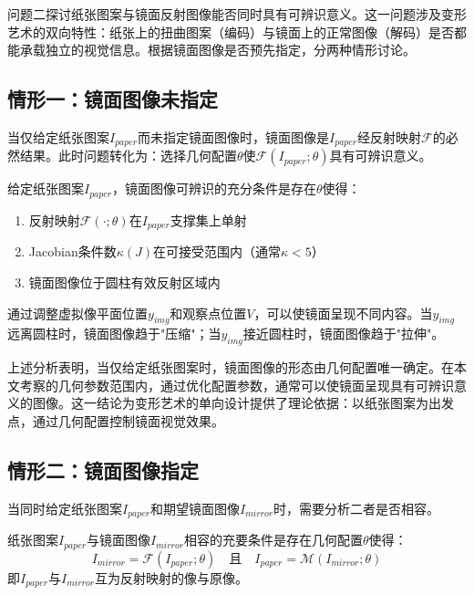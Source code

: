 \documentclass[withoutpreface]{cumcmthesis}
\begin{document}
问题二探讨纸张图案与镜面反射图像能否同时具有可辨识意义。这一问题涉及变形艺术的双向特性：纸张上的扭曲图案（编码）与镜面上的正常图像（解码）是否都能承载独立的视觉信息。根据镜面图像是否预先指定，分两种情形讨论。

\subsection{情形一：镜面图像未指定}

当仅给定纸张图案$I_{paper}$而未指定镜面图像时，镜面图像是$I_{paper}$经反射映射$\mathcal{F}$的必然结果。此时问题转化为：选择几何配置$\theta$使$\mathcal{F}(I_{paper};\theta)$具有可辨识意义。

\begin{theorem}[镜面图像可辨识条件]
给定纸张图案$I_{paper}$，镜面图像可辨识的充分条件是存在$\theta$使得：
\begin{enumerate}
    \item 反射映射$\mathcal{F}(\cdot;\theta)$在$I_{paper}$支撑集上单射
    \item Jacobian条件数$\kappa(J)$在可接受范围内（通常$\kappa<5$）
    \item 镜面图像位于圆柱有效反射区域内
\end{enumerate}
\end{theorem}

通过调整虚拟像平面位置$y_{img}$和观察点位置$V$，可以使镜面呈现不同内容。当$y_{img}$远离圆柱时，镜面图像趋于"压缩"；当$y_{img}$接近圆柱时，镜面图像趋于"拉伸"。

上述分析表明，当仅给定纸张图案时，镜面图像的形态由几何配置唯一确定。在本文考察的几何参数范围内，通过优化配置参数，通常可以使镜面呈现具有可辨识意义的图像。这一结论为变形艺术的单向设计提供了理论依据：以纸张图案为出发点，通过几何配置控制镜面视觉效果。

\subsection{情形二：镜面图像指定}

当同时给定纸张图案$I_{paper}$和期望镜面图像$I_{mirror}$时，需要分析二者是否相容。

\begin{theorem}[双图像相容性条件]
纸张图案$I_{paper}$与镜面图像$I_{mirror}$相容的充要条件是存在几何配置$\theta$使得：
\begin{equation}
I_{mirror} = \mathcal{F}(I_{paper}; \theta) \quad \text{且} \quad I_{paper} = \mathcal{M}(I_{mirror}; \theta)
\end{equation}
即$I_{paper}$与$I_{mirror}$互为反射映射的像与原像。
\end{theorem}
\end{document}
